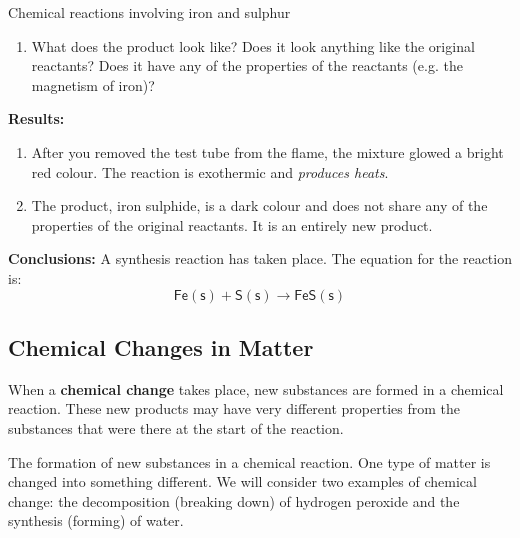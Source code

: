 \begin{g_experiment}{Chemical reactions involving iron and sulphur }
\begin{enumerate}[noitemsep, label=\textbf{\arabic*}. ]
\label{m38709*uid24}\item What does the product look like? Does it look anything like the original reactants? Does it have any of the properties of the reactants (e.g. the magnetism of iron)?
\end{enumerate}
        \par 
        \label{m38709*eip-963}
	\par
      \label{m38709*id63554}\noindent{}\textbf{Results:}
          \newline
        \label{m38709*id63560}\begin{enumerate}[noitemsep, label=\textbf{\arabic*}. ] 
            \label{m38709*uid25}\item After you removed the test tube from the flame, the mixture glowed a bright red colour. The reaction is exothermic and \textsl{produces heats}.
\label{m38709*uid26}\item The product, iron sulphide, is a dark colour and does not share any of the properties of the original reactants. It is an entirely new product.
\end{enumerate}
        \par 
        \label{m38709*id63594}\noindent{}\textbf{Conclusions:}
          \newline
A synthesis reaction has taken place. The equation for the reaction is:
        \label{m38709*id63604}\nopagebreak\noindent{}
    \begin{equation*}
    \mathsf{Fe (s)}+\mathsf{S (s)}\to \mathsf{FeS (s)}
      \end{equation*}
    \par 
\end{g_experiment}
    \label{m38709*cid3}
            \subsection*{Chemical Changes in Matter}
            \nopagebreak
      \label{m38709*id62778}When a \textbf{chemical change} takes place, new substances are formed in a chemical reaction. These new products may have very different properties from the substances that were there at the start of the reaction.\par 
            \label{m38709*fhsst!!!underscore!!!id107}
  { \label{m38709*meaningfhsst!!!underscore!!!id107}
      The formation of new substances in a chemical reaction. One type of matter is changed into something different. 
       } 
We will consider two examples of chemical change: the decomposition (breaking down) of hydrogen peroxide and the synthesis (forming) of water. \\
